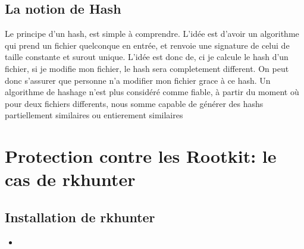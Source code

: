 \documentclass[10pt,a4paper]{article}
\newcommand{\insertcode}[2]{\begin{itemize}\item[]\end{itemize}}
\begin{document}
 \subsection{La notion de Hash}
 Le principe d'un hash, est simple à comprendre. L'idée est d'avoir un algorithme qui prend un fichier quelconque en entrée, et renvoie une signature de celui de taille constante et surout unique.
 L'idée est donc de, ci je calcule le hash d'un fichier, si je modifie mon fichier, le hash sera completement different.
 On peut donc s'assurer que personne n'a modifier mon fichier grace à ce hash.
 Un algorithme de hashage n'est plus considéré comme fiable, à partir du moment où pour deux fichiers differents, nous somme capable de générer des hashs partiellement similaires ou entierement similaires
 
\section{Protection contre les Rootkit:  le cas de rkhunter}
\subsection{   Installation de rkhunter }
\insertcode{commande/installRkhunter.txt}{Installation de RKHUNTER}
\end{document}
